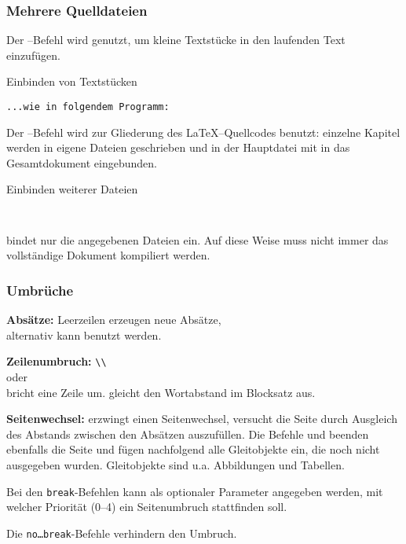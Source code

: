 \begin{frame}[c,fragile]
\frametitle{Mehrere Quelldateien}

Der --Befehl wird genutzt, um kleine Textst\"ucke in den laufenden Text einzuf\"ugen.
\begin{block}{Einbinden von Textst\"ucken}
\begin{verbatim}...wie in folgendem Programm:

\end{verbatim}
\end{block}


Der --Befehl wird zur Gliederung des \LaTeX--Quellcodes benutzt: einzelne Kapitel werden in eigene Dateien geschrieben
und in der Hauptdatei mit  in das Gesamtdokument eingebunden.

\begin{block}{Einbinden weiterer Dateien}
\begin{verbatim}


\end{verbatim}
\end{block}

 bindet nur die angegebenen Dateien ein. Auf diese Weise muss nicht immer das vollst\"andige Dokument kompiliert werden.

\end{frame}

\begin{frame}[c]
\frametitle{Umbr\"uche}
\justifying

\textbf{Abs\"atze:} Leerzeilen erzeugen neue Abs\"atze, \\[0.2mm]

alternativ kann  benutzt werden.\par

\textbf{Zeilenumbruch:} \texttt{\textbackslash\textbackslash} \\ oder  \\ bricht eine Zeile um.  \linebreak gleicht den Wortabstand im Blocksatz aus.

\textbf{Seitenwechsel:}  erzwingt einen Seitenwechsel,  versucht die Seite durch Ausgleich des Abstands zwischen den Abs\"atzen auszuf\"ullen.
Die Befehle  und  beenden ebenfalls die Seite und f\"ugen nachfolgend alle Gleitobjekte ein, die noch nicht ausgegeben wurden. Gleitobjekte sind u.a.{} Abbildungen und Tabellen.

Bei den \texttt{break}-Befehlen kann als optionaler Parameter angegeben werden, mit welcher Priorit\"at (0--4) ein Seitenumbruch stattfinden soll.

Die \texttt{no\ldots{}break}-Befehle verhindern den Umbruch.

\end{frame}

